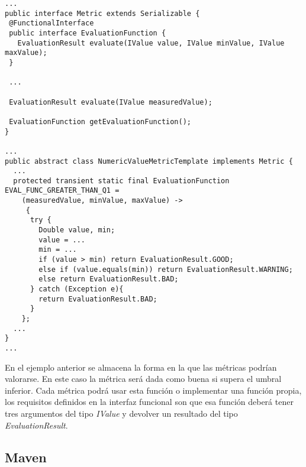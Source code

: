 \begin{minipage}{\linewidth}
{\tiny
\begin{lstlisting}[breaklines]
...
public interface Metric extends Serializable {
 @FunctionalInterface
 public interface EvaluationFunction {
   EvaluationResult evaluate(IValue value, IValue minValue, IValue maxValue);
 }

 ...
 
 EvaluationResult evaluate(IValue measuredValue);

 EvaluationFunction getEvaluationFunction();
}

...
public abstract class NumericValueMetricTemplate implements Metric {
  ...
  protected transient static final EvaluationFunction EVAL_FUNC_GREATER_THAN_Q1 = 
    (measuredValue, minValue, maxValue) -> 
     {
      try {
        Double value, min;
	    value = ...
	    min = ...
	    if (value > min) return EvaluationResult.GOOD;
	    else if (value.equals(min)) return EvaluationResult.WARNING;
	    else return EvaluationResult.BAD;
	  } catch (Exception e){
	    return EvaluationResult.BAD;
	  }
    };
  ...
}
...
\end{lstlisting}
}
\end{minipage}

En el ejemplo anterior se almacena la forma en la que las métricas podrían valorarse. En este caso la métrica será dada como buena si supera el umbral inferior. Cada métrica podrá usar esta función o implementar una función propia, los requisitos definidos en la interfaz funcional son que esa función deberá tener tres argumentos del tipo \textit{IValue} y devolver un resultado del tipo \textit{EvaluationResult}.

\subsection{Maven}

